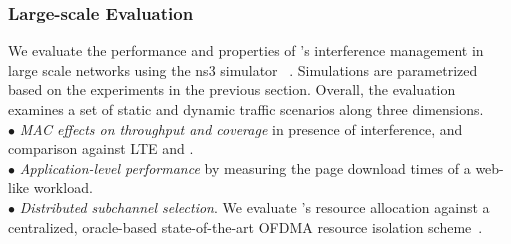 
\subsubsection{Large-scale Evaluation}
\label{sec:eval}

We evaluate the performance and properties of \cf 's interference management in large scale networks using the ns3 simulator ~\cite{ns3url}. 
Simulations are parametrized based on the experiments in the previous section. 
Overall, the evaluation examines a set of static and dynamic traffic scenarios along three dimensions.\\[2pt]
\noindent $\bullet$ \emph{MAC effects on throughput and coverage} in presence of interference, and comparison against LTE and \wf. \\[2pt]
\noindent $\bullet$ \emph{Application-level performance} by measuring the page download times of a web-like workload. \\[2pt]
\noindent $\bullet$ \emph{Distributed subchannel selection}. We evaluate \cf's resource allocation 
against a centralized, oracle-based state-of-the-art OFDMA resource isolation scheme~\cite{fermi}.\\


